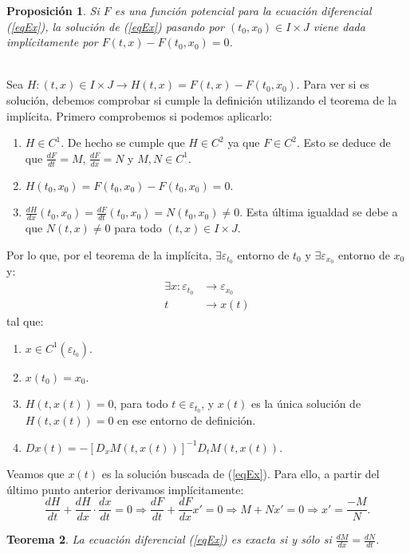 \documentclass[11pt, a4paper,twoside]{article}
\makeatletter
\theoremstyle{theorem-style}  %
\newtheorem{theorem}{Teorema}[section]  %
\newtheorem{proposition}[theorem]{Proposición}
\renewenvironment{proof}[1][\proofname]{\par
	\pushQED{\qed}%
	\normalfont \topsep6\p@\@plus6\p@\relax
	\list{}{%
		\settowidth{\leftmargin}{\quad:\hskip\labelsep}%
		\setlength{\labelwidth}{0pt}%
		\setlength{\itemindent}{-\leftmargin}%
	}%
	\item[\hskip\labelsep\itshape#1\@addpunct{:}]\ignorespaces
}{%
	\popQED\endlist\@endpefalse
}
\theoremstyle{definition-style}
\theoremstyle{example-style}
\makeatother
\begin{document}
\begin{proposition} \label{sol_exacta}
	Si $F$ es una función potencial para la ecuación diferencial (\ref{eqEx}), la solución de (\ref{eqEx}) pasando por $(t_0, x_0) \in I \times J$ viene dada implícitamente por $F(t, x) - F(t_0, x_0) = 0$.
\end{proposition}	
\begin{proof}\ \\
	Sea $H:(t, x) \in I \times J \longrightarrow H(t, x) = F(t, x) - F(t_0, x_0)$. Para ver si es solución, debemos comprobar si cumple  la definición utilizando el teorema de la implícita. Primero comprobemos si podemos aplicarlo:
	\begin{enumerate}
		\item $H \in C^1$. De hecho se cumple que $ H\in C^2 $ ya que $F \in C^2$. Esto se deduce de que $\frac{dF}{dt} = M$, $\frac{dF}{dx} = N$ y $M, N \in C^1$.
		\item $H(t_0, x_0) = F(t_0, x_0) - F(t_0, x_0) = 0$.
		\item $\frac{dH}{dx}(t_0, x_0) = \frac{dF}{dt}(t_0, x_0) = N(t_0, x_0) \neq 0$. Esta última igualdad se debe a que $N(t, x) \neq 0$ para todo $(t, x) \in I \times J$.
	\end{enumerate} 
	Por lo que, por el teorema de la implícita, $\exists \varepsilon_{t_0}$ entorno de $t_0$ y $\exists \varepsilon_{x_0}$ entorno de $x_0$ y:
	\begin{align*}
		\exists x : \varepsilon_{t_0} & \longrightarrow \varepsilon_{x_0} \\
		t & \longrightarrow x(t)
	\end{align*}
	tal que:
	\begin{enumerate}
		\item $x \in C^1(\varepsilon_{t_0})$.
		\item $x(t_0) = x_0$.
		\item $H(t, x(t)) = 0$, para todo $ t\in \varepsilon_{t_0} $, y $x(t)$ es la única solución de $H(t, x(t)) = 0$ en ese entorno de definición.
		\item $ D x(t)=-[D_x M(t,x(t))]^{-1}D_tM(t,x(t))$.
	\end{enumerate}
	Veamos que $x(t)$ es la solución buscada de (\ref{eqEx}). Para ello, a partir del último punto anterior derivamos implícitamente:
	\[\frac{dH}{dt} + \frac{dH}{dx} \cdot \frac{dx}{dt} = 0 \Rightarrow \frac{dF}{dt} + \frac{dF}{dx}x' = 0 \Rightarrow M + Nx' = 0 \Rightarrow x' = \frac{-M}{N}.\]
\end{proof}
\begin{theorem}
	La ecuación diferencial (\ref{eqEx}) es exacta si y sólo si $\frac{dM}{dx} = \frac{dN}{dt}$.
\end{theorem}
\end{document}
